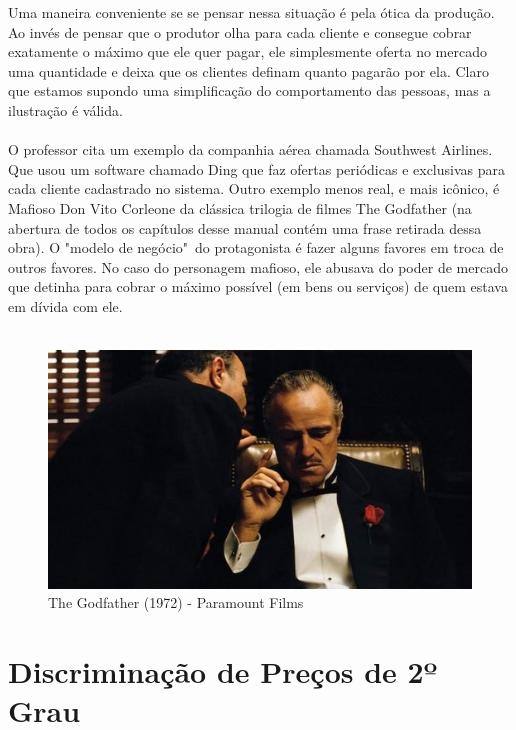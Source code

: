 \documentclass[a4paper,11pt,oneside]{book}
\theoremstyle{definition}
\theoremstyle{break}
\begin{document}
Uma maneira conveniente se se pensar nessa situação é pela ótica da produção. Ao invés de pensar que o produtor olha para cada cliente e consegue cobrar exatamente o máximo que ele quer pagar, ele simplesmente oferta no mercado uma quantidade e deixa que os clientes definam quanto pagarão por ela. Claro que estamos supondo uma simplificação do comportamento das pessoas, mas a ilustração é válida.
\\~\\
O professor cita um exemplo da companhia aérea chamada Southwest Airlines. Que usou um software chamado Ding que faz ofertas periódicas e exclusivas para cada cliente cadastrado no sistema. Outro exemplo menos real, e mais icônico, é Mafioso Don Vito Corleone da clássica trilogia de filmes The Godfather (na abertura de todos os capítulos desse manual contém uma frase retirada dessa obra). O "modelo de negócio"\ do protagonista é fazer alguns favores em troca de outros favores. No caso do personagem mafioso, ele abusava do poder de mercado que detinha para cobrar o máximo possível (em bens ou serviços) de quem estava em dívida com ele.
\\
\ 
\\
\begin{figure}[H]
\centering
\includegraphics[scale=0.5]{cap26_2-don_corleone.jpeg}
\caption*{The Godfather (1972) - Paramount Films}
\end{figure}

\section{Discriminação de Preços de 2º Grau}
\end{document}
